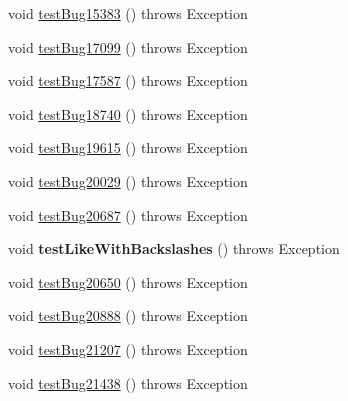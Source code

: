 \begin{DoxyCompactItemize}
\item 
void \mbox{\hyperlink{classtestsuite_1_1regression_1_1_statement_regression_test_a8077d99b51217d8479e3637eac582d17}{test\+Bug15383}} ()  throws Exception 
\item 
void \mbox{\hyperlink{classtestsuite_1_1regression_1_1_statement_regression_test_af66916471e845ecaf25d5a2e0e3b67eb}{test\+Bug17099}} ()  throws Exception 
\item 
void \mbox{\hyperlink{classtestsuite_1_1regression_1_1_statement_regression_test_a31f8a70535a902a36164d60c222d0430}{test\+Bug17587}} ()  throws Exception 
\item 
void \mbox{\hyperlink{classtestsuite_1_1regression_1_1_statement_regression_test_ab6784623c76f1e2dcd68a61ca256af75}{test\+Bug18740}} ()  throws Exception 
\item 
void \mbox{\hyperlink{classtestsuite_1_1regression_1_1_statement_regression_test_a8b65f0d094f2bb8f3e1fc9d4181c956c}{test\+Bug19615}} ()  throws Exception 
\item 
void \mbox{\hyperlink{classtestsuite_1_1regression_1_1_statement_regression_test_abe26694e3066526cd5be755352de286b}{test\+Bug20029}} ()  throws Exception 
\item 
void \mbox{\hyperlink{classtestsuite_1_1regression_1_1_statement_regression_test_a0267fce90c408fe4f218251a41707fdc}{test\+Bug20687}} ()  throws Exception 
\item 
\mbox{\label{classtestsuite_1_1regression_1_1_statement_regression_test_a0d2d4005580ed91cedff282491537e23}} 
void {\bfseries test\+Like\+With\+Backslashes} ()  throws Exception 
\item 
void \mbox{\hyperlink{classtestsuite_1_1regression_1_1_statement_regression_test_ac72c67849f782594f7036b96b6053eed}{test\+Bug20650}} ()  throws Exception 
\item 
void \mbox{\hyperlink{classtestsuite_1_1regression_1_1_statement_regression_test_a1c0e3e171ebbd64605711647d9b930c0}{test\+Bug20888}} ()  throws Exception 
\item 
void \mbox{\hyperlink{classtestsuite_1_1regression_1_1_statement_regression_test_a16c4c52784a96bfcf47397ce9a1d0efb}{test\+Bug21207}} ()  throws Exception 
\item 
void \mbox{\hyperlink{classtestsuite_1_1regression_1_1_statement_regression_test_a47c163cd72fcd1b2cf392941cd2b074c}{test\+Bug21438}} ()  throws Exception 
\item 

\end{DoxyCompactItemize}
